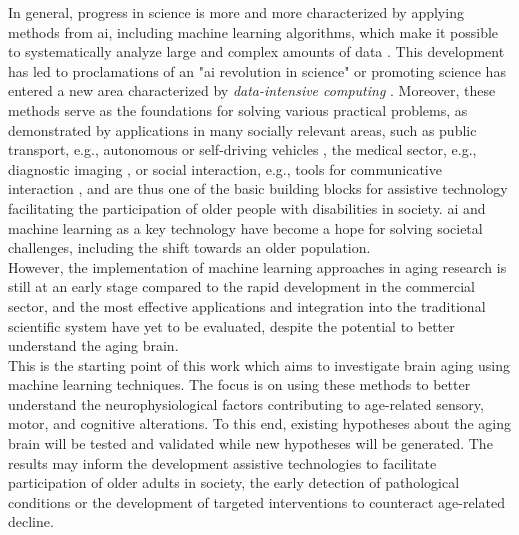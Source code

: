 In general, progress in science is more and more characterized by applying methods from \gls{ai}, including machine learning algorithms, which make it possible to systematically analyze large and complex amounts of data \cite{Brunton2019}. This development has led to proclamations of an "\gls{ai} revolution in science" \cite{Appenzeller2017} or promoting science has entered a new area characterized by \textit{data-intensive computing} \cite{Hey2009}. Moreover, these methods serve as the foundations for solving various practical problems, as demonstrated by applications in many socially relevant areas, such as public transport, e.g., autonomous or self-driving vehicles \cite{Leonard2020}, the medical sector, e.g., diagnostic imaging \cite{Liu2020}, or social interaction, e.g., tools for communicative interaction \cite{Adamopoulou2020}, and are thus one of the basic building blocks for assistive technology facilitating the participation of older people with disabilities in society. \Gls{ai} and machine learning as a key technology have become a hope for solving societal challenges, including the shift towards an older population.\\
However, the implementation of machine learning approaches in aging research is still at an early stage compared to the rapid development in the commercial sector, and the most effective applications and integration into the traditional scientific system have yet to be evaluated, despite the potential to better understand the aging brain.\\
This is the starting point of this work which aims to investigate brain aging using machine learning techniques. The focus is on using these methods to better understand the neurophysiological factors contributing to age-related sensory, motor, and cognitive alterations. To this end, existing hypotheses about the aging brain will be tested and validated while new hypotheses will be generated. The results may inform the development assistive technologies to facilitate participation of older adults in society, the early detection of pathological conditions or the development of targeted interventions to counteract age-related decline.

